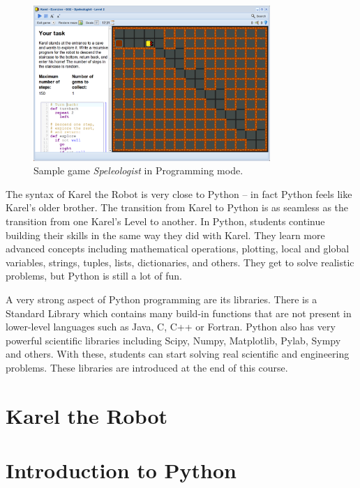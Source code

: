 \documentclass[article,A4,12pt]{llncs}
\begin{document}
\begin{figure}[!ht]
\begin{center}
\includegraphics[width=0.8\textwidth]{imgk/fore-2.png}
\end{center}
\vspace{-2mm}
\caption{Sample game {\em Speleologist} in Programming mode.}
\label{fig:f2}
\vspace{-4mm}
\end{figure}
\noindent
The syntax of Karel the Robot is very close to Python -- in fact Python feels like Karel's
older brother. The transition from Karel to Python is as seamless as the transition from 
one Karel's Level to another. 
In Python, students continue building their skills in the same way they did with Karel. 
They learn more advanced concepts including mathematical operations, plotting, local and 
global variables, strings, tuples, lists, dictionaries, and others. They get to solve 
realistic problems, but Python is still a lot of fun. 

A very strong aspect of Python programming are its libraries. There is a Standard Library which 
contains many build-in functions that are not present in lower-level languages such as 
Java, C, C++ or Fortran. Python also has very powerful scientific libraries including 
Scipy, Numpy, Matplotlib, Pylab, Sympy and others. With these, students can start solving 
real scientific and engineering problems. These libraries are introduced at the end of this 
course.  

\part{Karel the Robot}



\part{Introduction to Python}
\end{document}
